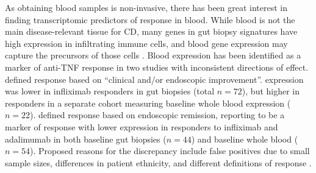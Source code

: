 As obtaining blood samples is non-invasive, there has been great interest in finding transcriptomic predictors of response in blood.
%
While blood is not the main disease-relevant tissue for \gls{CD},
many genes in gut biopsy signatures have high expression in infiltrating immune cells, and blood gene expression may capture the precursors of those cells \autocite{gaujoux2019CellcentredMetaanalysisReveals}.
Blood  expression has been identified as a marker of anti-\gls{TNF} response in two studies with inconsistent directions of effect.
\textcite{gaujoux2019CellcentredMetaanalysisReveals} defined response based on  
\enquote{clinical and/or endoscopic improvement}.
 expression was lower in infliximab responders in gut biopsies (total $n=72$),
but higher in responders in a separate cohort measuring baseline whole blood expression ($n=22$).
\textcite{verstockt2019LowTREM1Expression} defined response based on endoscopic remission, reporting  to be a marker of response 
with lower expression in responders to infliximab and adalimumab in both baseline gut biopsies ($n=44$) and baseline whole blood ($n=54$).
Proposed reasons for the discrepancy include false positives due to small sample sizes, differences in patient ethnicity, and different definitions of response \autocite{verstockt2019TREM1IdealPredictive,digby-bell2019InterrogatingHostImmunity}.

